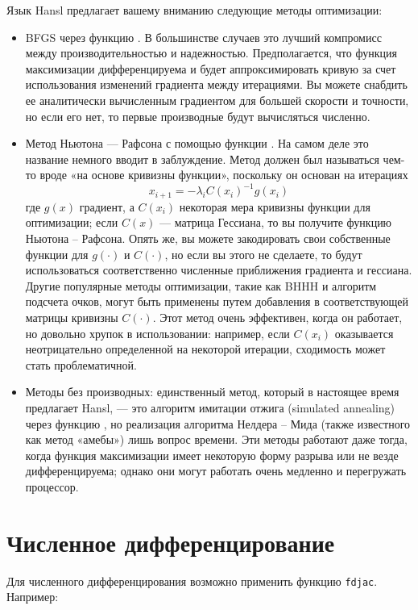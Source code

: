 Язык Hansl предлагает вашему вниманию следующие методы оптимизации:
\begin{itemize}
\item BFGS через функцию . В большинстве случаев это
  лучший компромисс между производительностью и
  надежностью. Предполагается, что функция максимизации
  дифференцируема и будет аппроксимировать кривую за счет
  использования изменений градиента между итерациями. Вы можете
  снабдить ее аналитически вычисленным градиентом для большей скорости
  и точности, но если его нет, то первые производные будут вычисляться
  численно.
\item Метод Ньютона --- Рафсона с помощью функции . На
  самом деле это название немного вводит в заблуждение. Метод должен
  был называться чем-то вроде «на основе кривизны функции», поскольку
  он основан на итерациях
  \[
    x_{i+1} = -\lambda_i C(x_i)^{-1} g(x_i)
  \]
  где $g(x)$ градиент, а $C(x_i)$ некоторая мера кривизны функции для
  оптимизации; если $C(x)$ --- матрица Гессиана, то вы получите
  функцию Ньютона – Рафсона. Опять же, вы можете закодировать свои
  собственные функции для $g(\cdot)$ и $C(\cdot)$, но если вы этого не
  сделаете, то будут использоваться соответственно численные
  приближения градиента и гессиана. Другие популярные методы
  оптимизации, такие как BHHH и алгоритм подсчета очков, могут быть
  применены путем добавления в  соответствующей матрицы
  кривизны $C(\cdot)$. Этот метод очень эффективен, когда он работает,
  но довольно хрупок в использовании: например, если $C(x_i)$
  оказывается неотрицательно определенной на некоторой итерации,
  сходимость может стать проблематичной.
\item Методы без производных: единственный метод, который в настоящее
  время предлагает Hansl, --- это алгоритм имитации отжига (simulated
  annealing) через функцию , но реализация алгоритма
  Нелдера – Мида (также известного как метод «амебы») лишь вопрос
  времени. Эти методы работают даже тогда, когда функция максимизации
  имеет некоторую форму разрыва или не везде дифференцируема; однако
  они могут работать очень медленно и перегружать процессор.
\end{itemize}

\section{Численное дифференцирование}
\label{sec:hp-numdiff}

Для численного дифференцирования возможно применить функцию
\texttt{fdjac}. Например:

